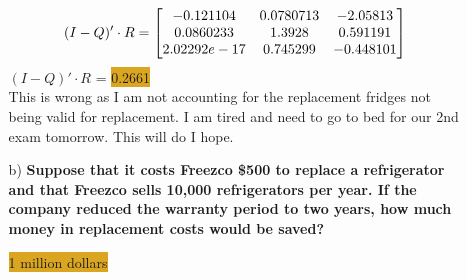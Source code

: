 \documentclass{article}
\begin{document}
\begin{enumerate}
\begin{enumerate}
\[
(I - Q)' \cdot R = 
\begin{bmatrix}
 -0.121104  &   0.0780713&  -2.05813\\
  0.0860233   & 1.3928   &   0.591191\\
  2.02292e-17 & 0.745299  & -0.448101\\
  \end{bmatrix}\\
\]
 $(I - Q)' \cdot R $ = \colorbox{Goldenrod}{0.2661}\\
This is wrong as I am not accounting for the replacement fridges not being valid for replacement. I am tired and need to go to bed for our 2nd exam tomorrow. This will do I hope.

\item[b) ] \textbf{Suppose that it costs Freezco \$500 to replace a refrigerator and that Freezco sells 10,000 refrigerators per year. If the company reduced the warranty period to two years, how much money in replacement costs would be saved?}


\colorbox{Goldenrod}{1 million dollars}

\end{enumerate}
\end{enumerate}
\end{document}
